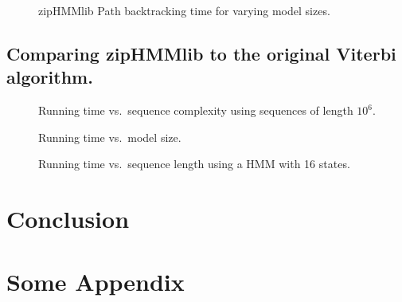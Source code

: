 \documentclass[11pt,twoside,a4,danish,english,report]{memoir}
\begin{document}
\begin{figure}[H]
  \centering
  
  \caption{zipHMMlib Path backtracking time for varying model sizes.}
  \label{fig:assymptotic_viterbi_backtrack_k}
\end{figure}

\section{Comparing zipHMMlib to the original Viterbi algorithm.}
\label{sec:comp-ziphmml-orig}

\begin{figure}[H]
  \centering
  
  \caption{Running time vs.\ sequence complexity using sequences of length $10^6$.}
  \label{fig:speedup_vs_complexity}
\end{figure}

\begin{figure}[H]
  \centering
  
  \caption{Running time vs.\ model size.}
  \label{fig:speedup_vs_k}
\end{figure}

\begin{figure}[H]
  \centering
  
  \caption{Running time vs.\ sequence length using a HMM with 16 states.}
  \label{fig:speedup_vs_sequence_length}
\end{figure}

\chapter{Conclusion}
\label{cha:conclusion}

\appendix{}

\chapter{Some Appendix}
\label{cha:some-appendix}

\backmatter{}


\end{document}
